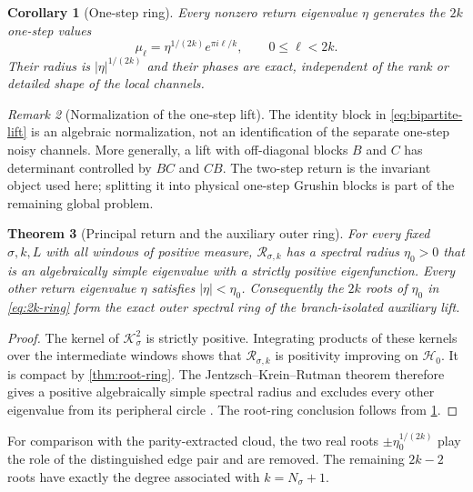 \documentclass[11pt]{article}
\newtheorem{theorem}{Theorem}[section]
\newtheorem{corollary}[theorem]{Corollary}
\theoremstyle{definition}
\theoremstyle{remark}
\newtheorem{remark}[theorem]{Remark}
\newcommand{\cK}{\mathcal K}
\newcommand{\cR}{\mathcal R}
\newcommand{\cH}{\mathcal H}
\begin{document}
\begin{corollary}[One-step ring]
\label{cor:one-step-ring}
Every nonzero return eigenvalue $\eta$ generates the $2k$ one-step values
\begin{equation}\label{eq:2k-ring}
 \mu_\ell=\eta^{1/(2k)}e^{\pi i\ell/k},
 \qquad 0\le\ell<2k.
\end{equation}
Their radius is $|\eta|^{1/(2k)}$ and their phases are exact, independent of
the rank or detailed shape of the local channels.
\end{corollary}

\begin{remark}[Normalization of the one-step lift]
\label{rem:lift-normalization}
The identity block in \eqref{eq:bipartite-lift} is an algebraic normalization,
not an identification of the separate one-step noisy channels.  More
generally, a lift with off-diagonal blocks $B$ and $C$ has determinant
controlled by $BC$ and $CB$.  The two-step return is the invariant object
used here; splitting it into physical one-step Grushin blocks is part of the
remaining global problem.
\end{remark}

\begin{theorem}[Principal return and the auxiliary outer ring]
\label{thm:principal-return}
For every fixed $\sigma,k,L$ with all windows of positive measure,
$\cR_{\sigma,k}$ has a spectral radius $\eta_0>0$ that is an algebraically
simple eigenvalue with a strictly positive eigenfunction.  Every other return
eigenvalue $\eta$ satisfies $|\eta|<\eta_0$.  Consequently the $2k$ roots of
$\eta_0$ in \eqref{eq:2k-ring} form the exact outer spectral ring of the
branch-isolated auxiliary lift.
\end{theorem}

\begin{proof}
The kernel of $\cK_\sigma^2$ is strictly positive.  Integrating products of
these kernels over the intermediate windows shows that
$\cR_{\sigma,k}$ is positivity improving on $\cH_0$.  It is compact by
\cref{thm:root-ring}.  The Jentzsch--Krein--Rutman theorem therefore gives a
positive algebraically simple spectral radius and excludes every other
eigenvalue from its peripheral circle
\citep{Schaefer1974}.  The root-ring conclusion follows from
\cref{cor:one-step-ring}.
\end{proof}

For comparison with the parity-extracted cloud, the two real roots
$\pm\eta_0^{1/(2k)}$ play the role of the distinguished edge pair and are
removed.  The remaining $2k-2$ roots have exactly the degree associated with
$k=N_\sigma+1$.
\end{document}
